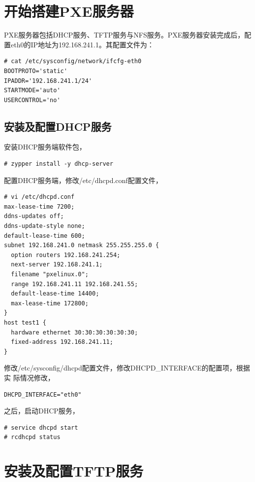 \section{开始搭建PXE服务器}
\label{sec:beginPXE}

PXE服务器包括DHCP服务、TFTP服务与NFS服务。PXE服务器安装完成后，配
置eth0的IP地址为192.168.241.1。其配置文件为：

\begin{verbatim}
# cat /etc/sysconfig/network/ifcfg-eth0
BOOTPROTO='static'
IPADDR='192.168.241.1/24'
STARTMODE='auto'
USERCONTROL='no'
\end{verbatim}

\subsection{安装及配置DHCP服务}
\label{sec:InstallDHCP}

安装DHCP服务端软件包，

\begin{verbatim}
# zypper install -y dhcp-server  
\end{verbatim}

配置DHCP服务端，修改/etc/dhcpd.conf配置文件，

\begin{verbatim}
# vi /etc/dhcpd.conf
max-lease-time 7200;
ddns-updates off;
ddns-update-style none;
default-lease-time 600;
subnet 192.168.241.0 netmask 255.255.255.0 { 
  option routers 192.168.241.254;
  next-server 192.168.241.1;
  filename "pxelinux.0";
  range 192.168.241.11 192.168.241.55;
  default-lease-time 14400;
  max-lease-time 172800;
}
host test1 {                                 
  hardware ethernet 30:30:30:30:30:30;
  fixed-address 192.168.241.11;
}  
\end{verbatim}

修改/etc/sysconfig/dhcpd配置文件，修改DHCPD\_INTERFACE的配置项，根据实
际情况修改，

\begin{verbatim}
DHCPD_INTERFACE="eth0"  
\end{verbatim}

之后，启动DHCP服务，

\begin{verbatim}
# service dhcpd start
# rcdhcpd status  
\end{verbatim}

\section{安装及配置TFTP服务}
\label{sec:InstallTFTP}

